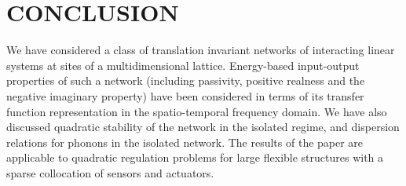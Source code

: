 \documentclass[letterpaper, 10pt, conference]{ieeeconf}  %
\def\<{\leqslant}           %
\def\>{\geqslant}           %
\def\div{\mathrm{div}}         %
\def\d{\partial}
\def\mR{\mathbb{R}}    %
\def\rT{\mathrm{T}}        %
\def\x{\times}
\def\cov{\mathbf{cov}}
\def\mT{\mathbb{T}}
\begin{document}
%
%
%
%
%
%




\section{CONCLUSION}
\label{sec:conc}


We have considered a class of translation invariant networks of interacting linear systems at sites of a multidimensional lattice.
Energy-based input-output properties of such a network (including passivity, positive realness and the negative imaginary property)  have been considered in terms of its transfer function representation in the spatio-temporal frequency domain. We have also discussed quadratic stability of the network in the isolated regime, %
and dispersion relations for phonons in the isolated network. The results of the paper are applicable to quadratic regulation problems for large flexible structures with a sparse collocation of sensors and actuators.
\end{document}
